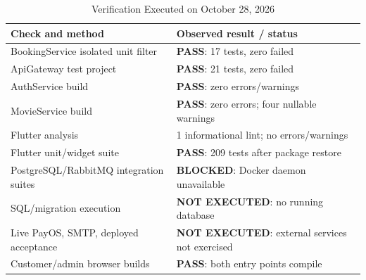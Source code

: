 \begin{table}[t]
\caption{Verification Executed on October 28, 2026}\label{tab:tests}
\centering\footnotesize
\begin{tabularx}{\columnwidth}{@{}YY@{}}\toprule
\textbf{Check and method} & \textbf{Observed result / status}\\\midrule
BookingService isolated unit filter & \textbf{PASS}: 17 tests, zero failed\\
ApiGateway test project & \textbf{PASS}: 21 tests, zero failed\\
AuthService build & \textbf{PASS}: zero errors/warnings\\
MovieService build & \textbf{PASS}: zero errors; four nullable warnings\\
Flutter analysis & 1 informational lint; no errors/warnings\\
Flutter unit/widget suite & \textbf{PASS}: 209 tests after package restore\\
PostgreSQL/RabbitMQ integration suites & \textbf{BLOCKED}: Docker daemon unavailable\\
SQL/migration execution & \textbf{NOT EXECUTED}: no running database\\
Live PayOS, SMTP, deployed acceptance & \textbf{NOT EXECUTED}: external services not exercised\\
Customer/admin browser builds & \textbf{PASS}: both entry points compile\\\bottomrule
\end{tabularx}
\end{table}

